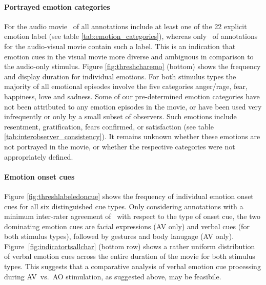 \paragraph{Portrayed emotion categories} For the audio movie
\AOFracWithLabeledEmotions\ of all annotations include at least one of the 22
explicit emotion label (see table \ref{tab:emotion_categories}), whereas only
\AVFracWithLabeledEmotions\ of annotations for the audio-visual movie contain
such a label. This is an indication that emotion cues in the visual movie more
diverse and ambiguous in comparison to the audio-only stimulus. Figure
\ref{fig:threshcharemo} (bottom) shows the frequency and display duration for
individual emotions. For both stimulus types the majority of all emotional
episodes involve the five categories anger/rage, fear, happiness, love and
sadness. Some of our pre-determined emotion categories have not been attributed
to any emotion episodes in the movie, or have been used very infrequently or
only by a small subset of observers.  Such emotions include resentment,
gratification, fears confirmed, or satisfaction (see table
\ref{tab:interobserver_consistency}).  It remains unknown whether these
emotions are not portrayed in the movie, or whether the respective categories
were not appropriately defined.

\paragraph{Emotion onset cues} Figure \ref{fig:threshlabeledoncue} shows the
frequency of individual emotion onset cues for all six distinguished cue types.
Only considering annotations with a minimum inter-rater agreement of
\AVAggThresh\ with respect to the type of onset cue, the two dominating emotion
cues are facial expressions (AV only) and verbal cues (for both stimulus
types), followed by gestures and body lanugage (AV only).
Figure~\ref{fig:indicatortsallchar} (bottom row) shows a rather uniform
distribution of verbal emotion cues across the entire duration of the movie for
both stimulus types. This suggests that a comparative analysis of verbal
emotion cue processing during AV~vs.~AO stimulation, as suggested above, may be
feasibile.

